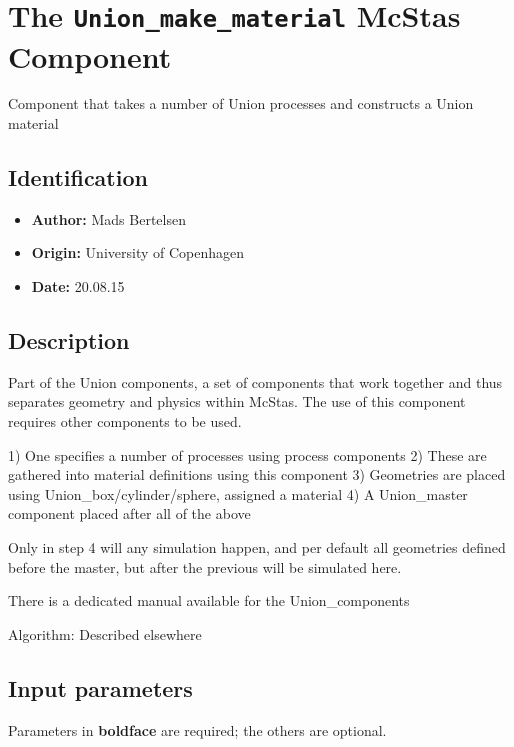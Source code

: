 \section{The \texttt{Union\_make\_material} McStas Component}
Component that takes a number of Union processes and constructs a Union material

\subsection*{Identification}
\begin{itemize}
  \item \textbf{Author:} Mads Bertelsen
  \item \textbf{Origin:} University of Copenhagen
  \item \textbf{Date:} 20.08.15
\end{itemize}

\subsection*{Description}
Part of the Union components, a set of components that work together and thus separates geometry and physics within McStas. The use of this component requires other components to be used.

1) One specifies a number of processes using process components 2) These are gathered into material definitions using this component 3) Geometries are placed using Union\_box/cylinder/sphere, assigned a material 4) A Union\_master component placed after all of the above

Only in step 4 will any simulation happen, and per default all geometries defined before the master, but after the previous will be simulated here.

There is a dedicated manual available for the Union\_components

Algorithm: Described elsewhere

\subsection*{Input parameters}
Parameters in \textbf{boldface} are required; the others are optional.

